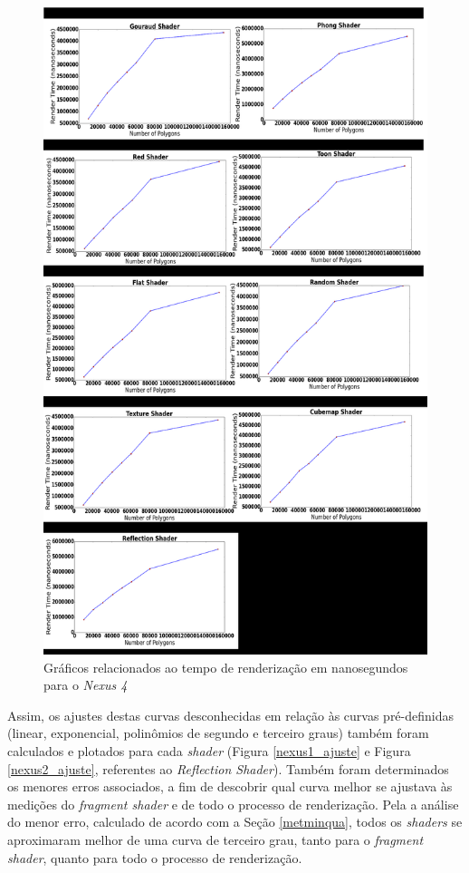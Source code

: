 	\begin{figure}[ht]
	\centering
		\includegraphics[keepaspectratio=true,scale=0.35]{figuras/render_time.png}
	\caption{Gráficos relacionados ao tempo de renderização em nanosegundos para o \textit{Nexus 4}}
	\label{nexus3}
	\end{figure}	


	 Assim, os ajustes destas curvas desconhecidas em relação às curvas pré-definidas (linear, exponencial, polinômios de segundo e terceiro graus) também foram calculados e plotados para cada \textit{shader} (Figura \ref{nexus1_ajuste} e Figura \ref{nexus2_ajuste}, referentes ao \textit{Reflection Shader}). Também foram determinados os menores erros associados, a fim de descobrir qual curva melhor se ajustava às medições do \textit{fragment shader} e de todo o processo de renderização. Pela a análise do menor erro, calculado de acordo com a Seção \ref{metminqua}, todos os \textit{shaders} se aproximaram melhor de uma curva de terceiro grau, tanto para o \textit{fragment shader}, quanto para todo o processo de renderização.
	
